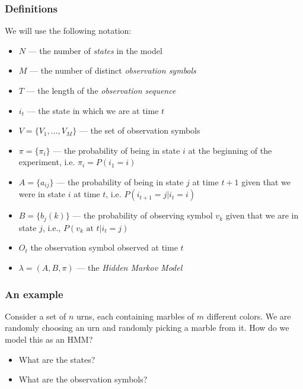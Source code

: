 \documentclass{beamer}
\begin{document}
\begin{frame} \frametitle{Definitions}

  We will use the following notation:
  \begin{itemize}
  \item $N$ --- the number of \emph{states} in the model
  \item $M$ --- the number of distinct \emph{observation symbols}
  \item $T$ --- the length of the \emph{observation sequence}
  \item $i_t$ --- the state in which we are at time $t$
  \item $V = \{V_1, \dotsc, V_M\}$ --- the set of observation symbols
  \item $\pi = \{\pi_i\}$ --- the probability of being in state $i$ at the
    beginning of the experiment, i.e. $\pi_i = P(i_1 = i)$
  \item $A = \{a_{ij}\}$ --- the probability of being in state $j$ at time
    $t+1$ given that we were in state $i$ at time $t$,
    i.e. $P(i_{t+1}=j|i_t=i)$
  \item $B = \{b_j(k)\}$ --- the probability of observing symbol $v_k$ given
    that we are in state $j$, i.e., $P(v_k \text{ at } t|i_t = j)$
  \item $O_t$ the observation symbol observed at time $t$
  \item $\lambda = (A, B, \pi)$ --- the \emph{Hidden Markov Model}
  \end{itemize}
  
\end{frame}


\begin{frame} \frametitle{An example}

  Consider a set of $n$ urns, each containing marbles of $m$ different
  colors. We are randomly choosing an urn and randomly picking a marble from
  it. How do we model this as an HMM?
  \begin{itemize}
  \item What are the states?
  \item What are the observation symbols?
  \end{itemize}

\end{frame}
\end{document}

